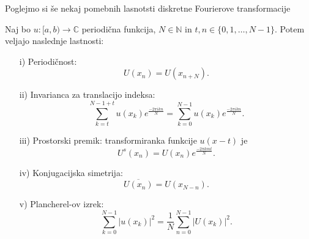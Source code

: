 \documentclass[mat2, tisk]{fmfdelo}
\newcommand{\N}{\mathbb N}
\newcommand{\C}{\mathbb C}
\begin{document}
Poglejmo si še nekaj pomebnih lasnotsti diskretne Fourierove transformacije
\begin{trditev}
Naj bo $u: [a, b) \rightarrow \C$ periodična funkcija, $N\in \N$ in\quad
$t, n \in \{0, 1, \dots, N-1\}$. Potem veljajo naslednje lastnosti:
\begin{enumerate}
  \item[i)] Periodičnost:
  \begin{equation}
    U(x_n) = U(x_{n + N}).
  \end{equation}
  \item[ii)] Invarianca za translacijo indeksa:
  \begin{equation}
  \sum_{k=t}^{N-1 + t} u(x_k) e^{\frac{-2\pi i k n}{N}} = \sum_{k=0}^{N-1} u(x_k) e^{\frac{-2\pi i k n}{N}}.
\end{equation}
  \item[iii)] Prostorski premik: transformiranka funkcije $u(x - t)$ je
  \begin{equation}
  U^s(x_n) = U(x_n)e^{\frac{-2\pi k m t}{N}} .
\end{equation}
  \item[iv)] Konjugacijska simetrija: 
  \begin{equation}
    \overline{U(x_n)} = U(x_{N-n}).
  \end{equation}
  \item[v)] Plancherel-ov izrek:
  \begin{equation}
    \sum_{k=0}^{N-1} |u(x_k)|^2 = \frac{1}{N}\sum_{n=0}^{N-1} |U(x_k)|^2.
  \end{equation}
\end{enumerate}
\end{trditev}
\end{document}
